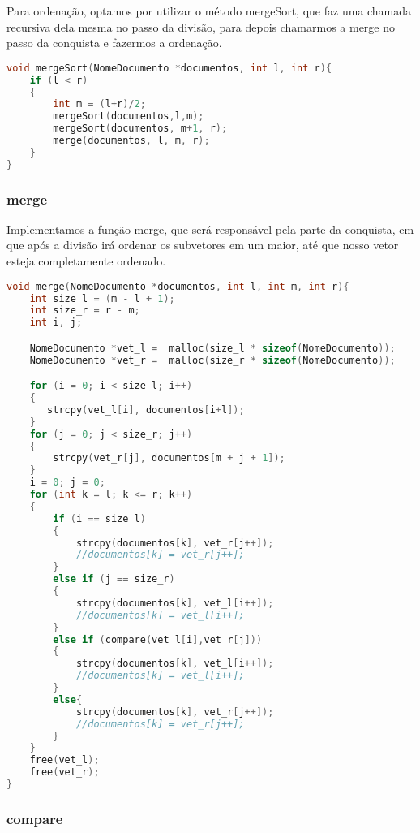 \documentclass{article}
\begin{document}
Para ordenação, optamos por utilizar o método mergeSort, que faz uma chamada recursiva dela mesma no passo
da divisão, para depois chamarmos a merge no passo da conquista e fazermos a ordenação.


\begin{lstlisting}[caption={Função mergeSort},label={lst:cod7},language=C]
void mergeSort(NomeDocumento *documentos, int l, int r){
    if (l < r)
    {
        int m = (l+r)/2;
        mergeSort(documentos,l,m);
        mergeSort(documentos, m+1, r);
        merge(documentos, l, m, r);
    }
}
\end{lstlisting}

\subsubsection{merge}

Implementamos a função merge, que será responsável pela parte da conquista, em que após a divisão
irá ordenar os subvetores em um maior, até que nosso vetor esteja completamente ordenado.
\begin{lstlisting}[caption={Função merge},label={lst:cod7},language=C]
void merge(NomeDocumento *documentos, int l, int m, int r){
    int size_l = (m - l + 1);
    int size_r = r - m;
    int i, j;

    NomeDocumento *vet_l =  malloc(size_l * sizeof(NomeDocumento));
    NomeDocumento *vet_r =  malloc(size_r * sizeof(NomeDocumento));

    for (i = 0; i < size_l; i++)
    {
       strcpy(vet_l[i], documentos[i+l]);
    }
    for (j = 0; j < size_r; j++)
    {
        strcpy(vet_r[j], documentos[m + j + 1]);
    }
    i = 0; j = 0;
    for (int k = l; k <= r; k++)
    {
        if (i == size_l)
        {
            strcpy(documentos[k], vet_r[j++]);
            //documentos[k] = vet_r[j++];
        }
        else if (j == size_r)
        {
            strcpy(documentos[k], vet_l[i++]);
            //documentos[k] = vet_l[i++];
        }
        else if (compare(vet_l[i],vet_r[j]))
        {
            strcpy(documentos[k], vet_l[i++]);
            //documentos[k] = vet_l[i++];
        }
        else{
            strcpy(documentos[k], vet_r[j++]);
            //documentos[k] = vet_r[j++];
        }
    }
    free(vet_l);
    free(vet_r);
}
\end{lstlisting}

\subsubsection{compare}
\end{document}
